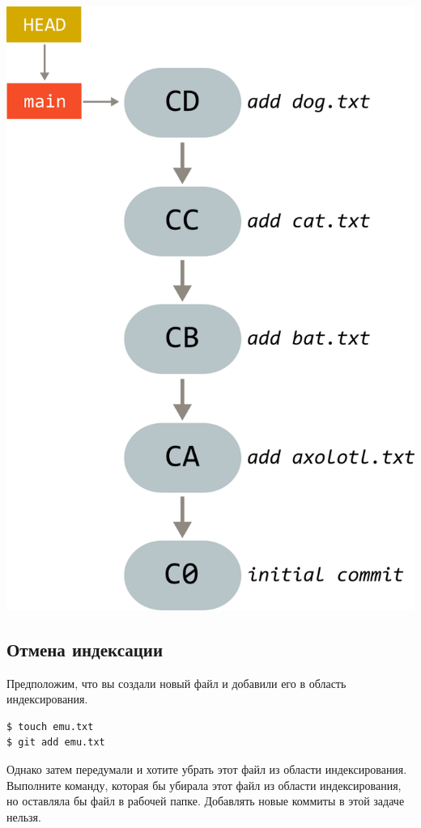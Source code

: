 \documentclass{article}
\begin{document}
\begin{center}
\includegraphics[scale=0.9]{../images/animals.png}
\end{center}



\subsection{Отмена индексации}
Предположим, что вы создали новый файл и добавили его в область индексирования.
\begin{lstlisting}[style=csMiptBash]
$ touch emu.txt
$ git add emu.txt
\end{lstlisting}
Однако затем передумали и хотите убрать этот файл из области индексирования.
Выполните команду, которая бы убирала этот файл из области индексирования, но оставляла бы файл в рабочей папке. Добавлять новые коммиты в этой задаче нельзя.
\end{document}
